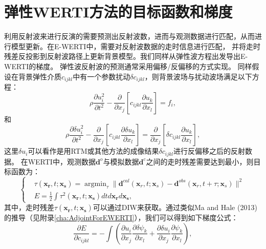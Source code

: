 \section{弹性WERTI方法的目标函数和梯度}
利用反射波来进行反演的需要预测出反射波数，进而与观测数据进行匹配，从而进行模型更新。在E-WERTI中，需要对反射波数据的走时信息进行匹配，
并将走时残差反投影到反射波路径上更新背景模型。我们同样从弹性波方程出发导出E-WERTI的梯度。
弹性波反射波的预测通常采用偏移/反偏移的方式实现。
同样假设在背景弹性介质$c_{ijkl}$中有一个参数扰动$\delta c_{ijkl}$，则背景波场与扰动波场满足以下方程：
\begin{equation}
    \rho \frac{\partial u^2_i}{\partial t^2}  -
    \frac{\partial}{\partial x_j}\left[ 
        c_{ijkl}\frac{\partial u_{k}}{\partial
        x_l}\right]=f_i,
    \label{eq:WE_3} 
\end{equation}
和
\begin{equation}
    \rho \frac{\partial \delta u^2_i}{\partial t^2}  -
    \frac{\partial}{\partial x_j}\left[ 
        c_{ijkl}\frac{\partial \delta u_{k}}{\partial
        x_l}\right]=\frac{\partial}{\partial x_j}\left[\delta c_{ijkl}\frac{\partial u_{k}}{\partial x_l}\right],
    \label{eq:DeltaWE} 
\end{equation}
这里$\delta u_i$可以看作是用RTM或其他方法的成像结果$\delta c_{ijkl}$进行反偏移之后的反射数据。
在WERTI中，观测数据$\mathbf{d}^{o}$与模拟数据$\mathbf{d}^{c}$之间的走时残差需要达到最小，则目标函数为：
\begin{equation}
	\left\{
		\begin{aligned}
			&\tau(\mathbf{x_r},t;\mathbf{x_s})=\mathop{\arg\min}_{\tau}
			\parallel\mathbf{d}^{cal}(\mathbf{x}_r,t;\mathbf{x}_s)-\mathbf{d}^{obs}(\mathbf{x}_r,t+\tau;\mathbf{x}_s)\parallel^2\\
    &E=\frac{1}{2}\int\tau^2(\mathbf{x_r},t;\mathbf{x_s})dtd\mathbf{x_r}d\mathbf{x_s},
		\end{aligned}
	\right.
    \label{eq:Objectivefunction} 
\end{equation}
其中，走时残差$\tau(\mathbf{x_r},t;\mathbf{x_s})$可以通过DIW来获取。通过类似Ma and
Hale (2013)\cite{ma2013}的推导（见附录\ref{cha:AdjointForEWERTI}），我们可以得到如下梯度公式：
\begin{equation}
    \frac{\partial E}{\partial c_{ijkl}}=-\int (\frac{\partial u_{i}}{\partial
    x_j}\frac{\partial \delta \psi_{k}}{\partial x_l}+\frac{\partial \delta u_{i}}{\partial
    x_j}\frac{\partial \psi_{k}}{\partial x_l}),
    \label{eq:GradientCijkl}
\end{equation}
